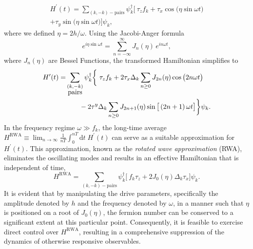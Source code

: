 \documentclass[%
reprint,
superscriptaddress,
amsmath,amssymb,
aps,
prb,
showkeys,
]{revtex4-2}
\begin{document}
\begin{multline}
	\label{eq:rotated:tfim}
	H^\prime(t) = \sum_{(k,-k)-\mbox{pairs}} \psi^\dagger_k
	\bigg[\ \tau_z f_k + \tau_x \cos{\big(\eta\sin{\omega t}\big)}  \\
	+ \tau_y \sin{\big(\eta\sin{\omega t}\big)}\bigg]\psi_k,
\end{multline}
where we defined $\eta=2h/\omega$. Using the Jacobi-Anger formula~\cite{arfkenmath}
\begin{equation}
	\label{eq:jacobi}
	e^{i \eta \sin{\omega t}} = \displaystyle\sum_{n=-\infty}^{\infty} J_n(\eta)\, e^{i n \omega t},
\end{equation} 
where $J_n(\eta)$ are Bessel Functions, the transformed Hamiltonian simplifies to \\
\begin{align}
	H^\prime(t) =& \sum_{\substack{(k,-k) \\ \mbox{pairs}}} \psi^\dagger_k
	\bigg\{\ \tau_z f_k + 2\tau_x \Delta_k \sum_{n\geq 0} J_{2n}(\eta)\cos{\big(2n\omega t\big)} \nonumber\\
	&\hskip 0.7cm- 2\tau^y\Delta_k \sum_{n\geq 0} J_{2n+1}(\eta)\sin{\big[\left(2n+1\right)\omega t\big]}   \bigg\}\psi_k.
\end{align}
In the frequency regime  $\omega \gg f_k$, the long-time average $H^{\mathrm{RWA}}\equiv\displaystyle\lim_{n\rightarrow\infty}\frac{1}{nT}\int^{nT}_0\mathrm{d}t\;H^\prime(t)$ can serve as a suitable approximation for $H^\prime(t)$. This approximation, known as the \emph{rotated wave approximation} (RWA), eliminates the oscillating modes and results in an effective Hamiltonian that is independent of time,
\begin{equation}
	\label{eq:hrwa:tfim}
	H^{\mathrm{RWA}} = \sum_{(k,-k)-\mbox{pairs}} \psi^\dagger_k
	\bigg[\ f_k\tau_z + 2 J_0(\eta) \Delta_k\tau_x \bigg]\psi_k.
\end{equation}
It is evident that by manipulating the drive parameters, specifically the amplitude denoted by $h$ and the frequency denoted by $\omega$, in a manner such that $\eta$ is positioned on a root of $J_0(\eta)$, the fermion number can be conserved to a significant extent at this particular point. Consequently, it is feasible to exercise direct control over $H^{\mathrm{RWA}}$, resulting in a comprehensive suppression of the dynamics of otherwise responsive observables.
\end{document}
